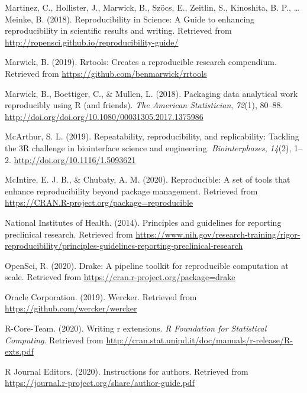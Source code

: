 \documentclass[12pt,twoside]{reedthesis}
\begin{document}
\leavevmode\hypertarget{ref-r-opensci}{}%
Martinez, C., Hollister, J., Marwick, B., Szöcs, E., Zeitlin, S., Kinoshita, B. P., \ldots{} Meinke, B. (2018). Reproducibility in Science: A Guide to enhancing reproducibility in scientific results and writing. Retrieved from \url{http://ropensci.github.io/reproducibility-guide/}

\leavevmode\hypertarget{ref-R-rrtools}{}%
Marwick, B. (2019). Rrtools: Creates a reproducible research compendium. Retrieved from \url{https://github.com/benmarwick/rrtools}

\leavevmode\hypertarget{ref-marwick2018packaging}{}%
Marwick, B., Boettiger, C., \& Mullen, L. (2018). Packaging data analytical work reproducibly using R (and friends). \emph{The American Statistician}, \emph{72}(1), 80--88. \url{http://doi.org/doi.org/10.1080/00031305.2017.1375986}

\leavevmode\hypertarget{ref-engineering-reproducibility}{}%
McArthur, S. L. (2019). Repeatability, reproducibility, and replicability: Tackling the 3R challenge in biointerface science and engineering. \emph{Biointerphases}, \emph{14}(2), 1--2. \url{http://doi.org/10.1116/1.5093621}

\leavevmode\hypertarget{ref-R-reproducible}{}%
McIntire, E. J. B., \& Chubaty, A. M. (2020). Reproducible: A set of tools that enhance reproducibility beyond package management. Retrieved from \url{https://CRAN.R-project.org/package=reproducible}

\leavevmode\hypertarget{ref-bio-principles}{}%
National Institutes of Health. (2014). Principles and guidelines for reporting preclinical research. Retrieved from \url{https://www.nih.gov/research-training/rigor-reproducibility/principles-guidelines-reporting-preclinical-research}

\leavevmode\hypertarget{ref-R-drake}{}%
OpenSci, R. (2020). Drake: A pipeline toolkit for reproducible computation at scale. Retrieved from \url{https://cran.r-project.org/package=drake}

\leavevmode\hypertarget{ref-wercker}{}%
Oracle Corporation. (2019). Wercker. Retrieved from \url{https://github.com/wercker/wercker}

\leavevmode\hypertarget{ref-coreteam-extensions}{}%
R-Core-Team. (2020). Writing r extensions. \emph{R Foundation for Statistical Computing}. Retrieved from \url{http://cran.stat.unipd.it/doc/manuals/r-release/R-exts.pdf}

\leavevmode\hypertarget{ref-r-journal}{}%
R Journal Editors. (2020). Instructions for authors. Retrieved from \url{https://journal.r-project.org/share/author-guide.pdf}
\end{document}
